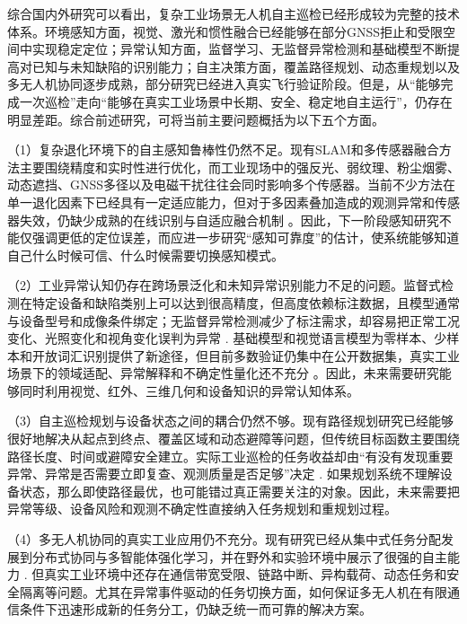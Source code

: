 综合国内外研究可以看出，复杂工业场景无人机自主巡检已经形成较为完整的技术体系。环境感知方面，视觉、激光和惯性融合已经能够在部分GNSS拒止和受限空间中实现稳定定位；异常认知方面，监督学习、无监督异常检测和基础模型不断提高对已知与未知缺陷的识别能力；自主决策方面，覆盖路径规划、动态重规划以及多无人机协同逐步成熟，部分研究已经进入真实飞行验证阶段。但是，从“能够完成一次巡检”走向“能够在真实工业场景中长期、安全、稳定地自主运行”，仍存在明显差距。综合前述研究，可将当前主要问题概括为以下五个方面。

（1）复杂退化环境下的自主感知鲁棒性仍然不足。现有SLAM和多传感器融合方法主要围绕精度和实时性进行优化，而工业现场中的强反光、弱纹理、粉尘烟雾、动态遮挡、GNSS多径以及电磁干扰往往会同时影响多个传感器。当前不少方法在单一退化因素下已经具有一定适应能力，但对于多因素叠加造成的观测异常和传感器失效，仍缺少成熟的在线识别与自适应融合机制
\cite{cadena2016past,lvyang2019sense,gupta2022slam,petrlik2020robust}。因此，下一阶段感知研究不能仅强调更低的定位误差，而应进一步研究“感知可靠度”的估计，使系统能够知道自己什么时候可信、什么时候需要切换感知模式。

（2）工业异常认知仍存在跨场景泛化和未知异常识别能力不足的问题。监督式检测在特定设备和缺陷类别上可以达到很高精度，但高度依赖标注数据，且模型通常与设备型号和成像条件绑定；无监督异常检测减少了标注需求，却容易把正常工况变化、光照变化和视角变化误判为异常
\cite{taox2021survey,roth2022towards,batzner2024efficientad}. 基础模型和视觉语言模型为零样本、少样本和开放词汇识别提供了新途径，但目前多数验证仍集中在公开数据集，真实工业场景下的领域适配、异常解释和不确定性量化还不充分
\cite{jeong2023winclip,kirillov2023segment,liu2024grounding,oquab2024dinov2}。因此，未来需要研究能够同时利用视觉、红外、三维几何和设备知识的异常认知体系。

（3）自主巡检规划与设备状态之间的耦合仍然不够。现有路径规划研究已经能够很好地解决从起点到终点、覆盖区域和动态避障等问题，但传统目标函数主要围绕路径长度、时间或避障安全建立。实际工业巡检的任务收益却由“有没有发现重要异常、异常是否需要立即复查、观测质量是否足够”决定
\cite{choset2001coverage,galceran2013survey,bircher2016receding}. 如果规划系统不理解设备状态，那么即使路径最优，也可能错过真正需要关注的对象。因此，未来需要把异常等级、设备风险和观测不确定性直接纳入任务规划和重规划过程。

（4）多无人机协同的真实工业应用仍不充分。现有研究已经从集中式任务分配发展到分布式协同与多智能体强化学习，并在野外和实验环境中展示了很强的自主能力
\cite{choi2009consensus,gronauer2022marl,zhou2022swarm,zhou2023racer}. 但真实工业环境中还存在通信带宽受限、链路中断、异构载荷、动态任务和安全隔离等问题。尤其在异常事件驱动的任务切换方面，如何保证多无人机在有限通信条件下迅速形成新的任务分工，仍缺乏统一而可靠的解决方案。

